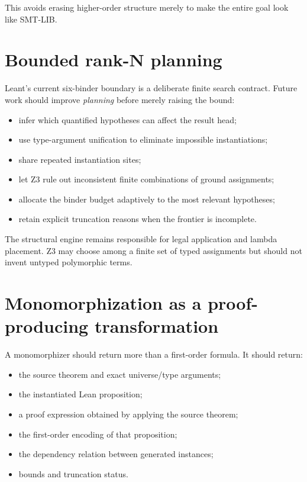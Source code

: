 \documentclass[11pt,letterpaper,openany]{report}
\begin{document}
This avoids erasing higher-order structure merely to make the entire goal look like
SMT-LIB.

\section{Bounded rank-N planning}

Leant's current six-binder boundary is a deliberate finite search contract. Future
work should improve \emph{planning} before merely raising the bound:

\begin{itemize}
  \item infer which quantified hypotheses can affect the result head;
  \item use type-argument unification to eliminate impossible instantiations;
  \item share repeated instantiation sites;
  \item let Z3 rule out inconsistent finite combinations of ground assignments;
  \item allocate the binder budget adaptively to the most relevant hypotheses;
  \item retain explicit truncation reasons when the frontier is incomplete.
\end{itemize}

The structural engine remains responsible for legal application and lambda placement.
Z3 may choose among a finite set of typed assignments but should not invent untyped
polymorphic terms.

\section{Monomorphization as a proof-producing transformation}

A monomorphizer should return more than a first-order formula. It should return:

\begin{itemize}
  \item the source theorem and exact universe/type arguments;
  \item the instantiated Lean proposition;
  \item a proof expression obtained by applying the source theorem;
  \item the first-order encoding of that proposition;
  \item the dependency relation between generated instances;
  \item bounds and truncation status.
\end{itemize}
\end{document}

